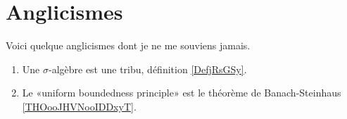 \section{Anglicismes}

Voici quelque anglicismes dont je ne me souviens jamais.
\begin{enumerate}
    \item
        Une \( \sigma\)-algèbre est une tribu, définition \ref{DefjRsGSy}.
    \item
        Le «uniform boundedness principle» est le théorème de Banach-Steinhaus \ref{THOooJHVNooIDDxyT}.
\end{enumerate}
